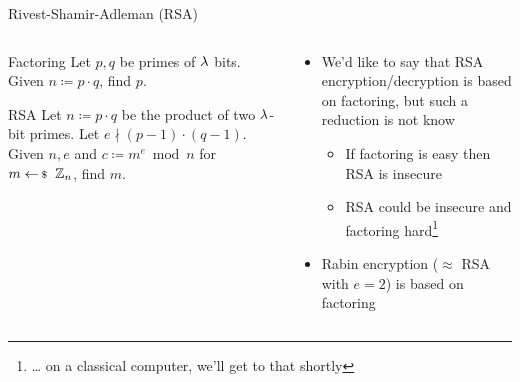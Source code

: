 \documentclass[xcolor=table,10pt,aspectratio=169]{beamer}
\begin{document}
\begin{frame}[label={sec:org9074196}]{Rivest-Shamir-Adleman (RSA)}
\begin{columns}[t]
\begin{column}{0.5\columnwidth}
\begin{block}{Factoring}
Let \(p, q\) be primes of \(\lambda\) bits. Given \(n \coloneqq p \cdot q\), find \(p\).
\end{block}
\begin{block}{RSA}
Let \(n \coloneqq p\cdot q\) be the product of two \(\lambda\)-bit primes. Let \(e \nmid (p-1)\cdot(q-1)\). Given \(n, e\) and \(c \coloneqq m^{e} \bmod n\) for \(m \sample \ZZ_{n}\), find \(m\).
\end{block}
{\footnotesize {} \par}
\end{column}
\begin{column}{0.5\columnwidth}
\begin{itemize}
\item We'd \alert{like} to say that RSA encryption/decryption is based on factoring, but such a reduction is not know
\begin{itemize}
\item If factoring is easy then RSA is insecure
\item RSA could be insecure and factoring hard\footnote{… on a classical computer, we'll get to that shortly}
\end{itemize}
\item Rabin encryption (\(\approx\) RSA with \(e=2\)) is based on factoring
\end{itemize}
\end{column}
\end{columns}
\end{frame}
\end{document}
